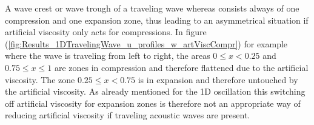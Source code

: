 \documentclass{report}
\begin{document}
 A wave crest or wave trough of a traveling wave whereas consists always of one compression and one expansion zone, thus leading to an asymmetrical situation if artificial viscosity only acts for compressions. In figure (\ref{fig:Results_1DTravelingWave_u_profiles_w_artViscCompr}) for example where the wave is traveling from left to right, the areas $0\leq x <0.25$ and $0.75\leq x \leq 1$ are zones in compression and therefore flattened due to the artificial viscosity. The zone $0.25\leq x <0.75$ is in expansion and therefore untouched by the artificial viscosity.
As already mentioned for the 1D oscillation this switching off artificial viscosity for expansion zones is therefore not an appropriate way of reducing artificial viscosity if traveling acoustic waves are present.

\begin{figure}[h]
 \label{fig:Results_1TravelingWave_u_profiles}
\centering
{}
\end{figure}
\end{document}
